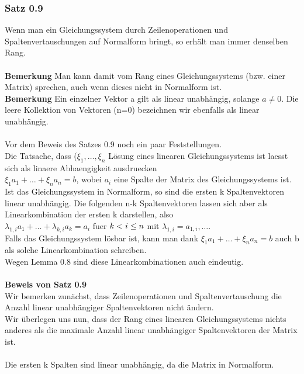 \documentclass{scrartcl}
\newcommand{\lb}{\lambda}
\begin{document}
\subsubsection{Satz 0.9}
Wenn man ein Gleichungssystem durch Zeilenoperationen und Spaltenvertauschungen auf Normalform bringt, so erh\"alt man immer denselben Rang.\\
\\
\textbf{Bemerkung} Man kann damit vom Rang eines Gleichungssystems (bzw. einer Matrix) sprechen, auch wenn dieses nicht in Normalform ist.\\
\textbf{Bemerkung} Ein einzelner Vektor a gilt als linear unabh\"angig, solange \(a \neq 0\). Die leere Kollektion von Vektoren (n=0) bezeichnen wir ebenfalls als linear unabh\"angig.\\
\\
Vor dem Beweis des Satzes 0.9 noch ein paar Feststellungen.\\
Die Tatsache, dass (\(\xi_1, \dots, \xi_n\) L\"osung eines linearen Gleichungssystems ist laesst sich als linaere Abhaengigkeit ausdruecken\\
\(\xi_1a_1 + \dots + \xi_n a_n = b\), wobei \(a_i\) eine Spalte der Matrix des Gleichungssystems ist.\\
Ist das Gleichungssystem in Normalform, so sind die ersten k Spaltenvektoren linear unabh\"angig. Die folgenden n-k Spaltenvektoren lassen sich aber als Linearkombination der ersten k darstellen, also\\
\(
\lb_{1,i}a_1 + \dots + \lb_{k,i}a_k = a_i \) fuer \( k < i \le n\\
\) mit \( \lb_{1,i} = a_{1,i}, \dots
\).
\\
Falls das Gleichungssystem l\"osbar ist, kann man dank \(\xi_1a_1 + \dots + \xi_n a_n = b\) auch b als solche Linearkombination schreiben.\\
Wegen Lemma 0.8 sind diese Linearkombinationen auch eindeutig.\\
\\
\textbf{Beweis von Satz 0.9}\\
Wir bemerken zun\"achst, dass Zeilenoperationen und Spaltenvertauschung die Anzahl linear unabh\"angiger Spaltenvektoren nicht \"andern.\\
Wir \"uberlegen uns nun, dass der Rang eines linearen Gleichungssystems nichts anderes als die maximale Anzahl linear unabh\"angiger Spaltenvektoren der Matrix ist.\\
\\
Die ersten k Spalten sind linear unabh\"angig, da die Matrix in Normalform.\\
\end{document}
